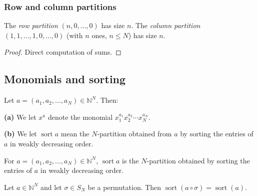 \subsubsection{Row and column partitions}

\begin{lemma}
\label{lem.sf.Npar-row-col}
\leanhelper
\leanok
The \emph{row partition} $(n, 0, \ldots, 0)$ has size $n$.
The \emph{column partition} $(1, 1, \ldots, 1, 0, \ldots, 0)$ (with $n$ ones, $n \leq N$)
has size $n$.
\end{lemma}

\begin{proof}
\leanok
Direct computation of sums.
\end{proof}

\subsection{Monomials and sorting}

\begin{definition}
\label{def.sf.sort}
\leantarget
\leanok
Let $a=\left(  a_{1},a_{2},\ldots,a_{N}\right)
\in\mathbb{N}^{N}$. Then:

\textbf{(a)} We let $x^{a}$ denote the monomial $x_{1}^{a_{1}}x_{2}^{a_{2}%
}\cdots x_{N}^{a_{N}}$.

\textbf{(b)} We let $\operatorname*{sort}a$ mean the $N$-partition obtained
from $a$ by sorting the entries of $a$ in weakly decreasing order.
\end{definition}

\begin{definition}
\label{def.sf.sort.b}
\leanhelper
\leanok
For $a = (a_1, a_2, \ldots, a_N) \in \mathbb{N}^N$,
$\operatorname{sort} a$ is the $N$-partition obtained by sorting the entries of $a$
in weakly decreasing order.
\end{definition}

\begin{lemma}
\label{lem.sf.sort-perm-invariant}
\leanhelper
\leanok
Let $a \in \mathbb{N}^N$ and let $\sigma \in S_N$ be a permutation. Then
$\operatorname{sort}(a \circ \sigma) = \operatorname{sort}(a)$.
\end{lemma}

